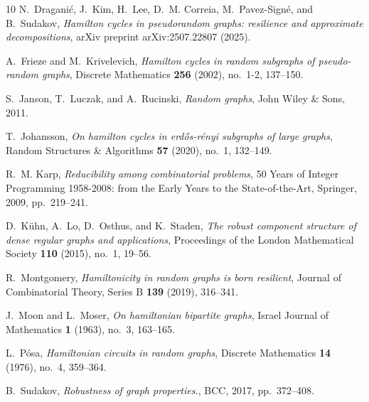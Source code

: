 \documentclass[reqno,final,a4paper]{amsart}
\numberwithin{equation}{section}
\theoremstyle{definition}
\theoremstyle{remark}
\begin{document}
\begin{thebibliography}{10}
N.~Dragani{\'c}, J.~Kim, H.~Lee, D.~M. Correia, M.~Pavez-Sign{\'e}, and B.~Sudakov, \emph{Hamilton cycles in pseudorandom graphs: resilience and approximate decompositions}, arXiv preprint arXiv:2507.22807 (2025).

A.~Frieze and M.~Krivelevich, \emph{Hamilton cycles in random subgraphs of pseudo-random graphs}, Discrete Mathematics \textbf{256} (2002), no.~1-2, 137--150.

S.~Janson, T.~Luczak, and A.~Rucinski, \emph{Random graphs}, John Wiley \& Sons, 2011.

T.~Johansson, \emph{On hamilton cycles in erd{\H{o}}s-r{\'e}nyi subgraphs of large graphs}, Random Structures \& Algorithms \textbf{57} (2020), no.~1, 132--149.

R.~M. Karp, \emph{Reducibility among combinatorial problems}, 50 Years of Integer Programming 1958-2008: from the Early Years to the State-of-the-Art, Springer, 2009, pp.~219--241.

D.~K{\"u}hn, A.~Lo, D.~Osthus, and K.~Staden, \emph{The robust component structure of dense regular graphs and applications}, Proceedings of the London Mathematical Society \textbf{110} (2015), no.~1, 19--56.

R.~Montgomery, \emph{Hamiltonicity in random graphs is born resilient}, Journal of Combinatorial Theory, Series B \textbf{139} (2019), 316--341.

J.~Moon and L.~Moser, \emph{On hamiltonian bipartite graphs}, Israel Journal of Mathematics \textbf{1} (1963), no.~3, 163--165.

L.~P{\'o}sa, \emph{Hamiltonian circuits in random graphs}, Discrete Mathematics \textbf{14} (1976), no.~4, 359--364.

B.~Sudakov, \emph{Robustness of graph properties.}, BCC, 2017, pp.~372--408.

\end{thebibliography}
\end{document}
